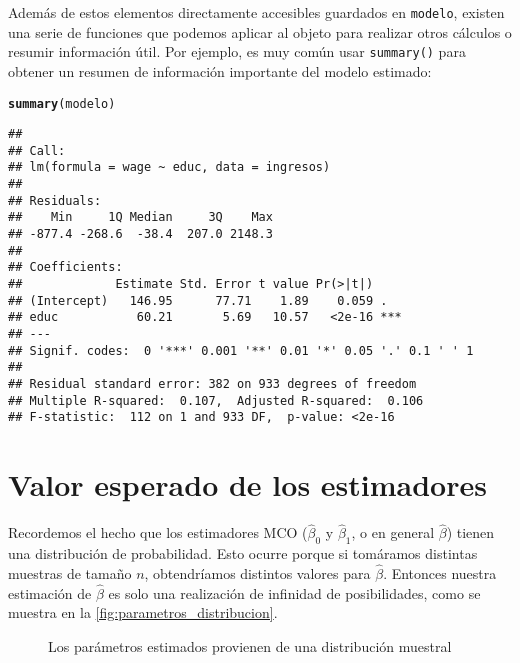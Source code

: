 \documentclass{report}\usepackage[]{graphicx}\usepackage[]{color}
\makeatletter
\newcommand{\hlstd}[1]{\textcolor[rgb]{0.345,0.345,0.345}{#1}}%
\newcommand{\hlkwd}[1]{\textcolor[rgb]{0.737,0.353,0.396}{\textbf{#1}}}%
\newenvironment{kframe}{%
 \def\at@end@of@kframe{}%
 \ifinner\ifhmode%
  \def\at@end@of@kframe{\end{minipage}}%
  \begin{minipage}{\columnwidth}%
 \fi\fi%
 \def\FrameCommand##1{\hskip\@totalleftmargin \hskip-\fboxsep
 \colorbox{shadecolor}{##1}\hskip-\fboxsep
     \hskip-\linewidth \hskip-\@totalleftmargin \hskip\columnwidth}%
 \MakeFramed {\advance\hsize-\width
   \@totalleftmargin\z@ \linewidth\hsize
   \@setminipage}}%
 {\par\unskip\endMakeFramed%
 \at@end@of@kframe}
\newenvironment{knitrout}{}{} %
\makeatother
\begin{document}
Además de estos elementos directamente accesibles guardados en \verb|modelo|, existen una serie de funciones que podemos aplicar al objeto para realizar otros cálculos o resumir información útil. Por ejemplo, es muy común usar \verb|summary()| para obtener un resumen de información importante del modelo estimado:
\begin{knitrout}
\color{fgcolor}\begin{kframe}
\begin{alltt}
\hlkwd{summary}\hlstd{(modelo)}
\end{alltt}
\begin{verbatim}
## 
## Call:
## lm(formula = wage ~ educ, data = ingresos)
## 
## Residuals:
##    Min     1Q Median     3Q    Max 
## -877.4 -268.6  -38.4  207.0 2148.3 
## 
## Coefficients:
##             Estimate Std. Error t value Pr(>|t|)    
## (Intercept)   146.95      77.71    1.89    0.059 .  
## educ           60.21       5.69   10.57   <2e-16 ***
## ---
## Signif. codes:  0 '***' 0.001 '**' 0.01 '*' 0.05 '.' 0.1 ' ' 1
## 
## Residual standard error: 382 on 933 degrees of freedom
## Multiple R-squared:  0.107,	Adjusted R-squared:  0.106 
## F-statistic:  112 on 1 and 933 DF,  p-value: <2e-16
\end{verbatim}
\end{kframe}
\end{knitrout}

\section{Valor esperado de los estimadores}

Recordemos el hecho que los estimadores MCO ($\hat\beta_0$ y $\hat\beta_1$, o en general $\hat\beta$) tienen una distribución de probabilidad.
Esto ocurre porque si tomáramos distintas muestras de tamaño $n$, obtendríamos distintos valores para $\hat\beta$.
Entonces nuestra estimación de $\hat\beta$ es solo una realización de infinidad de posibilidades, como se muestra en la \autoref{fig:parametros_distribucion}.

\begin{figure}[htb]
  \centering
  \caption{Los parámetros estimados provienen de una distribución muestral}
  \label{fig:parametros_distribucion}
\end{figure}%
\end{document}
